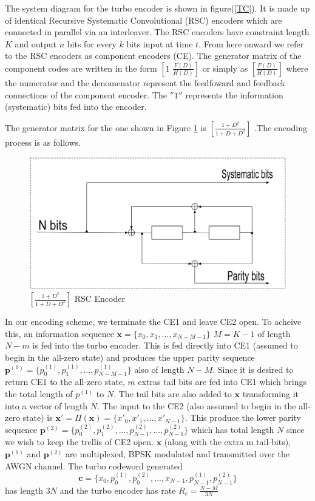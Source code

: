 \documentclass[a4paper, 12pt, oneside, openary]{jbook}
\begin{document}
The system diagram for the turbo encoder is shown in figure(\ref{TC}).
 It is made up of identical Recursive Systematic Convolutional (RSC) encoders which 
 are connected
  in parallel via an interleaver. The RSC encoders have constraint length $K$ and output
  $n$ bits for every $k$ bits input at time $t$.
  From here onward we refer to the RSC encoders as component 
encoders (CE). The generator matrix of the component codes are written in 
the form $[1\,\, \frac{F(D)}{H(D)}]$ or simply as $[\frac{F(D)}{H(D)}]$
where the numerator and the denomenator represent the feedfoward and feedback
 connections of the component encoder. The $''1''$ represents the information 
 (systematic) bits fed into the encoder.

 The generator matrix for the one shown in Figure \ref{RSC}
 is $[\frac{1+D^2}{1+D+D^2}]$ .The encoding process is as follows.

\begin{figure}[h!]
\centering
		\includegraphics[width=\textwidth]{RSCExample3.eps}
		\caption{$[\frac{1+D^2}{1+D+D^2}]$  RSC Encoder}
		\label{RSC}
		\end{figure}


In our encoding scheme, we terminate the CE1 and leave CE2 open. 
To acheive this,	
 an information sequence $\mathbf{x}=\{x_0,x_1,...,x_{N-M-1} \} $
$M=K-1$
of length $N-m$ is fed into the turbo encoder. This is fed directly into CE1 (assumed to 
begin in the all-zero state) and produces the upper parity sequence 
$\mathbf{p}^{(1)}=\{p^{(1)}_0,p^{(1)}_1,...,p^{(1)}_{N-M-1} \}$ also of 
length $N-M$. 
Since it is desired to return CE1 to the all-zero state, $m$ extras tail bits 
are fed into CE1 which brings the total length of $p^{(1)}$ to $N$. The tail bits are
also added to $\mathbf{x}$ transforming it into a vector of length $N$.
The input to the CE2 (also assumed to 
begin in the all-zero state) is 
$\mathbf{x'}=\Pi(\mathbf{x})= \{x'_0,x'_1,...,x'_{N-1} \} $. This produce the lower 
parity sequence 
$\mathbf{p}^{(2)}=\{p^{(2)}_0,p^{(2)}_1,...,p^{(2)}_{N-1},...,p^{(2)}_{N-1} \}$
 which has total length $N$ since we wish to keep the trellis of CE2 open.
 $\mathbf{x}$ (along with the extra m tail-bits), $\mathbf{p}^{(1)}$
 and $\mathbf{p}^{(2)}$ are multiplexed, BPSK modulated and transmitted over the
 AWGN channel.
 The turbo codeword generated  
 $$\mathbf{c}=\{x_0,p^{(1)}_0,p^{(2)}_0,...,x_{N-1},p^{(1)}_{N-1},p^{(2)}_{N-1} \} $$ 
 has length $3N$ and the
 turbo encoder has rate $R_c=\frac{N-M}{3N}  $
\end{document}
